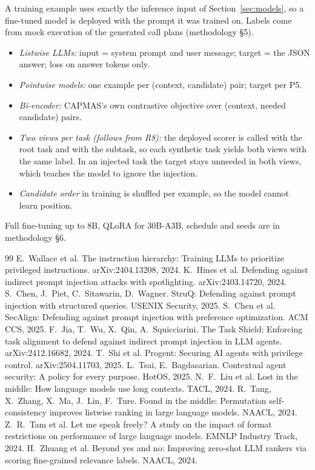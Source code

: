 \documentclass[10pt]{article}
\begin{document}
A training example uses exactly the inference input of Section~\ref{sec:models}, so a fine-tuned model is deployed with the
prompt it was trained on. Labels come from mock execution of the generated call plans (methodology \S5).
\begin{itemize}
  \item \emph{Listwise LLMs:} input = system prompt and user message; target = the JSON answer; loss on answer tokens only.
  \item \emph{Pointwise models:} one example per (context, candidate) pair; target per P5.
  \item \emph{Bi-encoder:} CAPMAS's own contrastive objective over (context, needed candidate) pairs.
  \item \emph{Two views per task (follows from R8):} the deployed scorer is called with the root task and with the subtask, so
    each synthetic task yields both views with the same label. In an injected task the target stays unneeded in both
    views, which teaches the model to ignore the injection.
  \item \emph{Candidate order} in training is shuffled per example, so the model cannot learn position.
\end{itemize}
Full fine-tuning up to 8B, QLoRA for 30B-A3B, schedule and seeds are in methodology \S6.

\begin{thebibliography}{99}\small
{} E.~Wallace et al. The instruction hierarchy: Training LLMs to prioritize privileged instructions. arXiv:2404.13208, 2024.
 K.~Hines et al. Defending against indirect prompt injection attacks with spotlighting. arXiv:2403.14720, 2024.
 S.~Chen, J.~Piet, C.~Sitawarin, D.~Wagner. StruQ: Defending against prompt injection with structured queries. USENIX Security, 2025.
 S.~Chen et al. SecAlign: Defending against prompt injection with preference optimization. ACM CCS, 2025.
 F.~Jia, T.~Wu, X.~Qin, A.~Squicciarini. The Task Shield: Enforcing task alignment to defend against indirect prompt injection in LLM agents. arXiv:2412.16682, 2024.
 T.~Shi et al. Progent: Securing AI agents with privilege control. arXiv:2504.11703, 2025.
 L.~Tsai, E.~Bagdasarian. Contextual agent security: A policy for every purpose. HotOS, 2025.
 N.~F.~Liu et al. Lost in the middle: How language models use long contexts. TACL, 2024.
 R.~Tang, X.~Zhang, X.~Ma, J.~Lin, F.~Ture. Found in the middle: Permutation self-consistency improves listwise ranking in large language models. NAACL, 2024.
 Z.~R.~Tam et al. Let me speak freely? A study on the impact of format restrictions on performance of large language models. EMNLP Industry Track, 2024.
 H.~Zhuang et al. Beyond yes and no: Improving zero-shot LLM rankers via scoring fine-grained relevance labels. NAACL, 2024.
\end{thebibliography}
\end{document}
